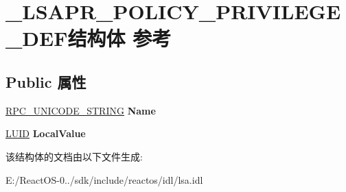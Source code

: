 \hypertarget{struct___l_s_a_p_r___p_o_l_i_c_y___p_r_i_v_i_l_e_g_e___d_e_f}{}\section{\+\_\+\+L\+S\+A\+P\+R\+\_\+\+P\+O\+L\+I\+C\+Y\+\_\+\+P\+R\+I\+V\+I\+L\+E\+G\+E\+\_\+\+D\+E\+F结构体 参考}
\label{struct___l_s_a_p_r___p_o_l_i_c_y___p_r_i_v_i_l_e_g_e___d_e_f}
\subsection*{Public 属性}
\begin{DoxyCompactItemize}
\item 
\mbox{\label{struct___l_s_a_p_r___p_o_l_i_c_y___p_r_i_v_i_l_e_g_e___d_e_f_ae64676475068d8f1638ab61a8acc25b1}} 
\hyperlink{struct___r_p_c___u_n_i_c_o_d_e___s_t_r_i_n_g}{R\+P\+C\+\_\+\+U\+N\+I\+C\+O\+D\+E\+\_\+\+S\+T\+R\+I\+NG} {\bfseries Name}
\item 
\mbox{\label{struct___l_s_a_p_r___p_o_l_i_c_y___p_r_i_v_i_l_e_g_e___d_e_f_a553e99856e6ba88bf7b7182be1643ddf}} 
\hyperlink{struct___l_u_i_d}{L\+U\+ID} {\bfseries Local\+Value}
\end{DoxyCompactItemize}


该结构体的文档由以下文件生成\+:\begin{DoxyCompactItemize}
\item 
E\+:/\+React\+O\+S-\/0../sdk/include/reactos/idl/lsa.\+idl\end{DoxyCompactItemize}
